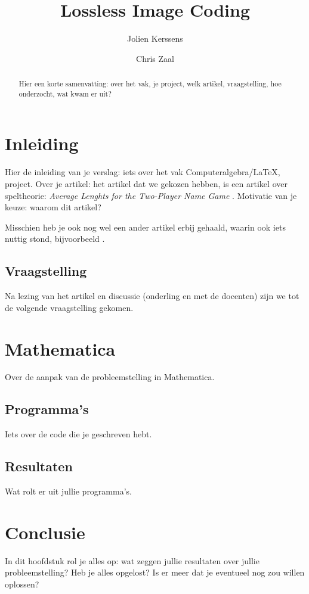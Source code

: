 \documentclass{uvamath}
\title{Lossless Image Coding}
\author[chrisz@science.uva.nl, 6127901]{Jolien Kerssens}
\author[jolienk@science.uva.nl, 6123102]{Chris Zaal}
\begin{document}
\maketitle

\begin{abstract}
Hier een korte samenvatting: over het vak, je project, welk artikel, vraagstelling, hoe onderzocht, wat kwam er uit?
\end{abstract}

\tableofcontents

\chapter{Inleiding}
Hier de inleiding van je verslag: iets over het vak Computeralgebra/\LaTeX, project. Over je artikel: het artikel dat we gekozen hebben, is een artikel over speltheorie: \emph{Average Lenghts for the Two-Player Name Game} \cite{artikelNeal}. Motivatie van je keuze: waarom dit artikel?

Misschien heb je ook nog wel een ander artikel erbij gehaald, waarin ook iets nuttig stond, bijvoorbeeld \cite{artikelHopkins}.

\section{Vraagstelling}
Na lezing van het artikel en discussie (onderling en met de docenten) zijn we tot de volgende vraagstelling gekomen. 


\chapter{Mathematica}
Over de aanpak van de probleemstelling in Mathematica. 

\section{Programma's}
Iets over de code die je geschreven hebt. 

\section{Resultaten}
Wat rolt er uit jullie programma's. 

\chapter{Conclusie}
In dit hoofdstuk rol je alles op: wat zeggen jullie resultaten over jullie probleemstelling? Heb je alles opgelost? Is er meer dat je eventueel nog zou willen oplossen?
\end{document}
